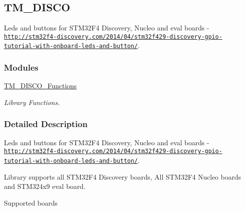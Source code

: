\hypertarget{group___t_m___d_i_s_c_o}{}\subsection{T\+M\+\_\+\+D\+I\+S\+C\+O}
\label{group___t_m___d_i_s_c_o}


Leds and buttons for S\+T\+M32\+F4 Discovery, Nucleo and eval boards -\/ \href{http://stm32f4-discovery.com/2014/04/stm32f429-discovery-gpio-tutorial-with-onboard-leds-and-button/}{\tt http\+://stm32f4-\/discovery.\+com/2014/04/stm32f429-\/discovery-\/gpio-\/tutorial-\/with-\/onboard-\/leds-\/and-\/button/}.  


\subsubsection*{Modules}
\begin{DoxyCompactItemize}
\item 
\hyperlink{group___t_m___d_i_s_c_o___functions}{T\+M\+\_\+\+D\+I\+S\+C\+O\+\_\+\+Functions}
\begin{DoxyCompactList}\small\item\em Library Functions. \end{DoxyCompactList}\end{DoxyCompactItemize}


\subsubsection{Detailed Description}
Leds and buttons for S\+T\+M32\+F4 Discovery, Nucleo and eval boards -\/ \href{http://stm32f4-discovery.com/2014/04/stm32f429-discovery-gpio-tutorial-with-onboard-leds-and-button/}{\tt http\+://stm32f4-\/discovery.\+com/2014/04/stm32f429-\/discovery-\/gpio-\/tutorial-\/with-\/onboard-\/leds-\/and-\/button/}. 

Library supports all S\+T\+M32\+F4 Discovery boards, All S\+T\+M32\+F4 Nucleo boards and S\+T\+M324x9 eval board.

\begin{DoxyParagraph}{Supported boards}

\end{DoxyParagraph}

